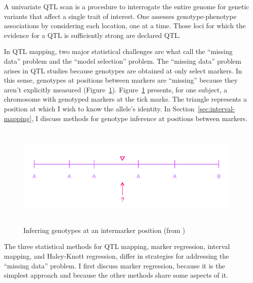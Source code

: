 \documentclass[oneside]{book}\usepackage[]{graphicx}\usepackage[]{color}
\makeatletter
\def\maxwidth{ %
  \ifdim\Gin@nat@width>\linewidth
    \linewidth
  \else
    \Gin@nat@width
  \fi
}
\newenvironment{knitrout}{}{} %
\def\maxwidth{\ifdim\Gin@nat@width>\linewidth\linewidth\else\Gin@nat@width\fi}
\makeatother
\begin{document}
A univariate QTL scan is a procedure to interrogate the entire genome for genetic
variants that affect a single trait of interest. 
One assesses genotype-phenotype associations by considering each location, one at a time. 
Those loci for which the evidence for a QTL is sufficiently
strong are declared QTL. 


In QTL mapping, two major statistical challenges are what \citet{broman2009guide} call 
the ``missing data'' problem and the ``model selection'' problem. 
The ``missing data'' problem arises in QTL studies because genotypes are obtained
at only select markers. In this sense, genotypes at positions between
markers are ``missing'' because they aren't explicitly measured
(Figure~\ref{fig:genoprob1}). Figure~\ref{fig:genoprob1} presents, for
one subject, a chromosome with genotyped markers at the tick marks.
The triangle represents a position at which I wish to know the allele's identity.
In Section~\ref{sec:interval-mapping}, I discuss methods for genotype inference at positions between markers. 

\begin{knitrout}
\color{fgcolor}\begin{figure}
\includegraphics[width=\maxwidth,height=2in]{figure/genoprob1-1} \caption[Inferring genotypes at an intermarker position (from \citet{broman2009guide})]{Inferring genotypes at an intermarker position (from \citet{broman2009guide})}\label{fig:genoprob1}
\end{figure}


\end{knitrout}

The three statistical methods for QTL mapping, marker regression, 
interval mapping, and Haley-Knott regression, differ in strategies for addressing 
the ``missing data'' problem. I first discuss marker regression, because it is the 
simplest approach and because the other methods share some aspects of it.
\end{document}
